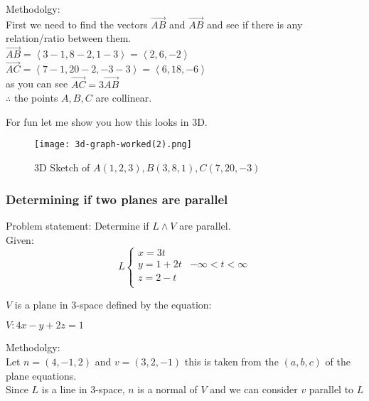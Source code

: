 Methodolgy: \\

First we need to find the vectors $\vec{AB}$ and $\vec{AB}$ and see if there is any relation/ratio between them.\\

$\vec{AB} = \left\langle 3-1,8-2,1-3\right\rangle = \left\langle 2,6,-2\right\rangle$ \\

$\vec{AC} = \left\langle 7-1,20-2,-3-3\right\rangle = \left\langle 6,18,-6\right\rangle$ \\

as you can see $\vec{AC} = 3\vec{AB}$ \\

$\therefore$ the points $A,B,C$ are collinear.

For fun let me show you how this looks in 3D.

\begin{figure}[H]
\centering
\texttt{[image: 3d-graph-worked(2).png]}
\caption{3D Sketch of $A(1,2,3) , B(3,8,1), C(7,20,-3)$}
\label{fig:Plane_3D_worked_2}
\end{figure}

\subsubsection{Determining if two planes are parallel}
Problem statement: Determine if $L \land V$ are parallel. \\ 

Given: \\

\[ L
\begin{cases} 
x = 3t \\ 
y = 1+2t & -\infty < t < \infty \\ 
z = 2-t \\
\end{cases} 
\]

$V$ is a plane in 3-space defined by the equation: \\
\begin{center}
$V: 4x-y+2z=1$
\end{center}

Methodolgy: \\

Let $n = (4,-1,2)$ and $v = (3,2,-1)$ this is taken from the $(a,b,c)$ of the plane equations. \\

Since $L$ is a line in 3-space, $n$ is a normal of $V$ and we can consider $v$ parallel to $L$


